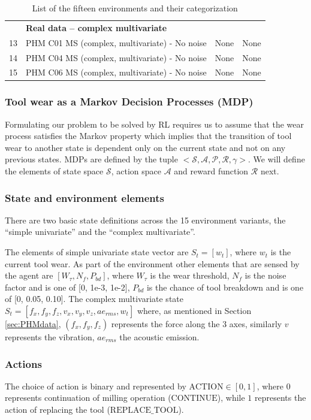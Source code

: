 \documentclass[a4paper, 12pt]{article}
\begin{document}
\begin{table}
\begin{tabular}{@{}r l rr@{}}
		\rule{0pt}{1.5\normalbaselineskip}
		& \multicolumn{3}{l}{\textbf{Real data -- complex multivariate}}\\
		13 & PHM C01 MS (complex, multivariate) - No noise & None & None \\
		14 & PHM C04 MS (complex, multivariate) - No noise & None & None \\
		15 & PHM C06 MS (complex, multivariate) - No noise & None & None \\ \bottomrule
	\end{tabular}
	\caption{List of the fifteen environments and their categorization}
	\label{tbl:ListEnvironments}
\end{table}

\subsubsection*{Tool wear as a Markov Decision Processes (MDP)}
Formulating our problem to be solved by RL requires us to assume that the wear process satisfies the Markov property which implies that the transition of tool wear to another state is dependent only on the current state and not on any previous states. MDPs are defined by the tuple $<\mathcal{S, A, P, R, \gamma}>$. We will define the elements of state space $\mathcal{S}$, action space $\mathcal{A}$ and reward function $\mathcal{R}$ next.

\subsubsection*{State and environment elements}
There are two basic state definitions across the 15 environment variants, the ``simple univariate'' and the ``complex multivariate''. 

The elements of simple univariate state vector are $S_t = [w_t]$, where $w_t$ is the current tool wear. As part of the environment other elements that are sensed by the agent are $[W_\tau, N_f, P_{bd}]$, where $W_\tau$ is the wear threshold, $N_f$ is the noise factor and is one of [0, 1e-3, 1e-2], $P_{bd}$ is the chance of tool breakdown and is one of [0, 0.05, 0.10]. The complex multivariate state $S_t = [f_x, f_y, f_z, v_x, v_y, v_z, ae_{rms}, w_t]$ where, as mentioned in Section \ref{sec:PHMdata}, $(f_x, f_y, f_z)$ represents the force along the 3 axes, similarly $v$ represents the vibration, $ae_{rms}$ the acoustic emission.

\subsubsection*{Actions}
The choice of action is binary and represented by $\text{ACTION} \in [0, 1]$, where $0$ represents continuation of milling operation ($\text{CONTINUE}$), while $1$ represents the action of replacing the tool ($\text{REPLACE\_TOOL}$).
\end{document}
